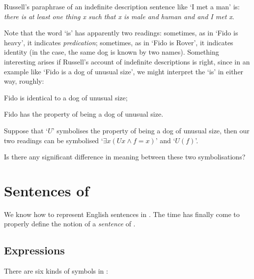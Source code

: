 \problempart
Russell's paraphrase of an indefinite description sentence like `I met a man' is: \emph{there is at least one thing x such that x is male and human and and I met x}. 

Note that the word `is' has apparently two readings: sometimes, as in `Fido is heavy', it indicates \emph{predication}; sometimes, as in `Fido is Rover', it indicates identity (in the case, the same dog is known by two names). Something interesting arises if Russell's account of indefinite descriptions is right, since in an example like `Fido is a dog of unusual size', we might interpret the `is' in either way, roughly:
\begin{earg}
 \item Fido is identical to a dog of unusual size;
 \item Fido has the property of being a dog of unusual size.
 \end{earg} Suppose that `$U$' symbolises the property of being a dog of unusual size, then our two readings can be symbolised `$\exists x (Ux \wedge f=x)$' and `$U(f)$'. 

 Is there any significant difference in meaning between these two symbolisations?  






\chapter{Sentences of \textnormal{\FOL}}\label{s:FOLSentences}
We know how to represent English sentences in \FOL. The time has finally come to properly define the notion of a \emph{sentence} of \FOL.

\section{Expressions}
There are six kinds of symbols in \FOL:


